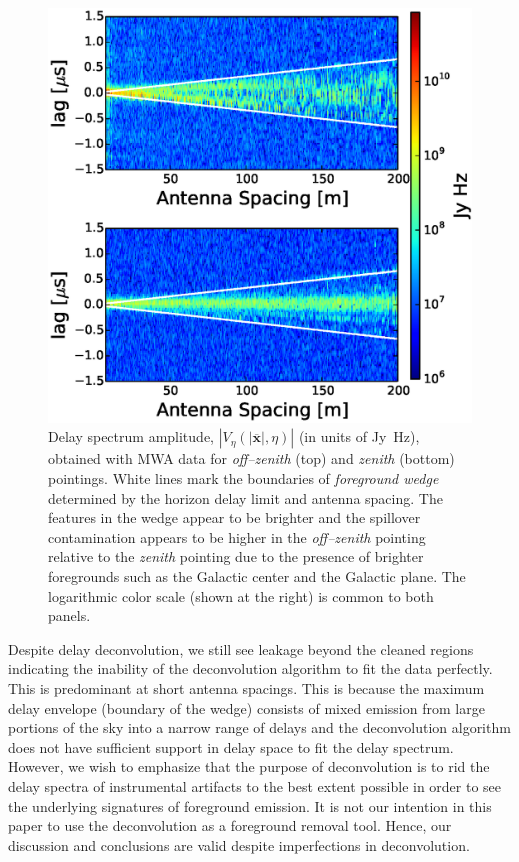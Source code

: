 \documentclass[preprint2,iop,numberedappendix]{emulateapj}
\begin{document}
\begin{figure}[htb]
\centering
\includegraphics[width=\linewidth]{figures/v1_0/multi_baseline_fhd_delay_spectrum_snapshots.eps}
\caption{Delay spectrum amplitude, $|V_\eta(|\overline{\mathbf{x}}|,\eta)|$ (in units of Jy~Hz), obtained with MWA data for {\it off--zenith} (top) and {\it zenith} (bottom) pointings. White lines mark the boundaries of {\it foreground wedge} determined by the horizon delay limit and antenna spacing. The features in the wedge appear to be brighter and the spillover contamination appears to be higher in the {\it off--zenith} pointing relative to the {\it zenith} pointing due to the presence of brighter foregrounds such as the Galactic center and the Galactic plane. The logarithmic color scale (shown at the right) is common to both panels.\label{fig:fhd_data}}
\end{figure}

Despite delay deconvolution, we still see leakage beyond the cleaned regions indicating the inability of the deconvolution algorithm to fit the data perfectly. This is predominant at short antenna spacings. This is because the maximum delay envelope (boundary of the wedge) consists of mixed emission from large portions of the sky into a narrow range of delays and the deconvolution algorithm does not have sufficient support in delay space to fit the delay spectrum. However, we wish to emphasize that the purpose of deconvolution is to rid the delay spectra of instrumental artifacts to the best extent possible in order to see the underlying signatures of foreground emission. It is not our intention in this paper to use the deconvolution as a foreground removal tool. Hence, our discussion and conclusions are valid despite imperfections in deconvolution.
\end{document}
